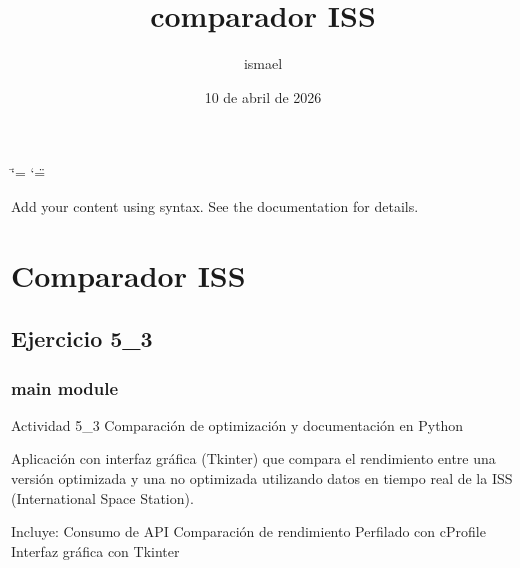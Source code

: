 \documentclass[letterpaper,10pt,spanish]{sphinxmanual}
\title{comparador ISS}
\date{10 de abril de 2026}
\author{ismael}
\begin{document}
\ifdefined\shorthandoff
  \ifnum\catcode`\=\string=\active\shorthandoff{=}\fi
  \ifnum\catcode`\"=\active{}\fi
\fi

\pagestyle{empty}
\sphinxmaketitle
\pagestyle{plain}
\sphinxtableofcontents
\pagestyle{normal}
\label{\detokenize{index::doc}}


\sphinxAtStartPar
Add your content using  syntax. See the
documentation for details.


\chapter{Comparador ISS}
\label{\detokenize{index:comparador-iss}}
\sphinxstepscope


\section{Ejercicio 5\_3}
\label{\detokenize{modules:ejercicio-5-3}}\label{\detokenize{modules::doc}}
\sphinxstepscope


\subsection{main module}
\label{\detokenize{main:module-main}}\label{\detokenize{main:main-module}}\label{\detokenize{main::doc}}
\sphinxAtStartPar
Actividad 5\_3 \sphinxhyphen{} Comparación de optimización y documentación en Python

\sphinxAtStartPar
Aplicación con interfaz gráfica (Tkinter) que compara el rendimiento
entre una versión optimizada y una no optimizada utilizando datos en
tiempo real de la ISS (International Space Station).

\sphinxAtStartPar
Incluye:
\sphinxhyphen{} Consumo de API
\sphinxhyphen{} Comparación de rendimiento
\sphinxhyphen{} Perfilado con cProfile
\sphinxhyphen{} Interfaz gráfica con Tkinter
\end{document}
